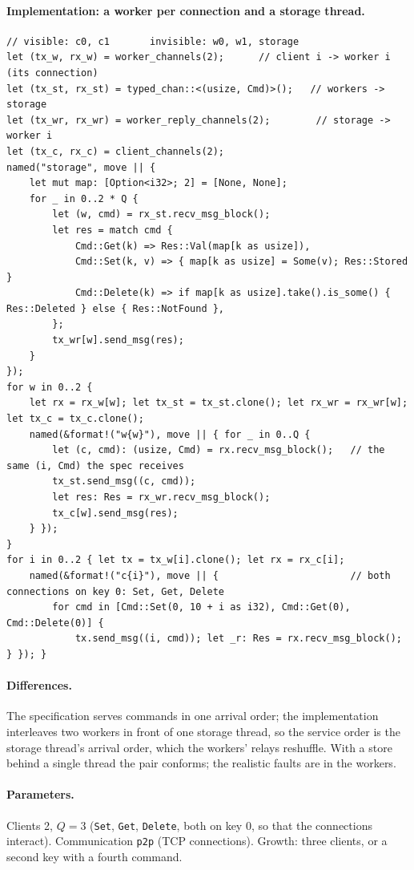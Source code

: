 \documentclass[11pt,a4paper]{article}
\newcommand{\code}[1]{\texttt{#1}}
\begin{document}
\paragraph{Implementation: a worker per connection and a storage thread.}
\begin{lstlisting}
// visible: c0, c1       invisible: w0, w1, storage
let (tx_w, rx_w) = worker_channels(2);      // client i -> worker i (its connection)
let (tx_st, rx_st) = typed_chan::<(usize, Cmd)>();   // workers -> storage
let (tx_wr, rx_wr) = worker_reply_channels(2);        // storage -> worker i
let (tx_c, rx_c) = client_channels(2);
named("storage", move || {
    let mut map: [Option<i32>; 2] = [None, None];
    for _ in 0..2 * Q {
        let (w, cmd) = rx_st.recv_msg_block();
        let res = match cmd {
            Cmd::Get(k) => Res::Val(map[k as usize]),
            Cmd::Set(k, v) => { map[k as usize] = Some(v); Res::Stored }
            Cmd::Delete(k) => if map[k as usize].take().is_some() { Res::Deleted } else { Res::NotFound },
        };
        tx_wr[w].send_msg(res);
    }
});
for w in 0..2 {
    let rx = rx_w[w]; let tx_st = tx_st.clone(); let rx_wr = rx_wr[w]; let tx_c = tx_c.clone();
    named(&format!("w{w}"), move || { for _ in 0..Q {
        let (c, cmd): (usize, Cmd) = rx.recv_msg_block();   // the same (i, Cmd) the spec receives
        tx_st.send_msg((c, cmd));
        let res: Res = rx_wr.recv_msg_block();
        tx_c[w].send_msg(res);
    } });
}
for i in 0..2 { let tx = tx_w[i].clone(); let rx = rx_c[i];
    named(&format!("c{i}"), move || {                       // both connections on key 0: Set, Get, Delete
        for cmd in [Cmd::Set(0, 10 + i as i32), Cmd::Get(0), Cmd::Delete(0)] {
            tx.send_msg((i, cmd)); let _r: Res = rx.recv_msg_block(); } }); }
\end{lstlisting}

\paragraph{Differences.} The specification serves commands in one arrival order; the
implementation interleaves two workers in front of one storage thread, so the service order is
the storage thread's arrival order, which the workers' relays reshuffle. With a store behind a
single thread the pair conforms; the realistic faults are in the workers.

\paragraph{Parameters.} Clients 2, $Q = 3$ (\code{Set}, \code{Get}, \code{Delete}, both on key
0, so that the connections interact). Communication \code{p2p} (TCP connections). Growth: three
clients, or a second key with a fourth command.
\end{document}
